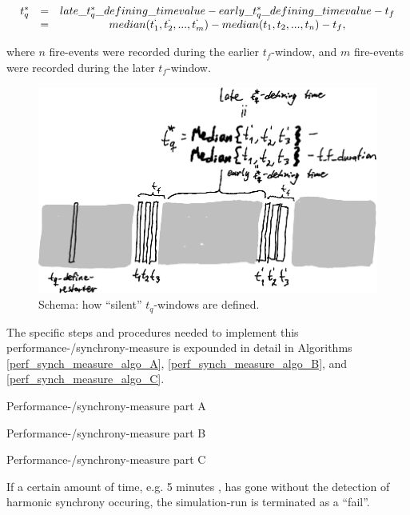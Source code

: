 \begin{equation}
\label{t_q_definition}
\begin{array}{rrclcl}
t_q^* & = & late\_t_q^*\_defining\_timevalue - early\_t_q^*\_defining\_timevalue - t_f \\
& = & median(t_1^`, t_2^`, ..., t_m^`) - median(t_1, t_2, ..., t_n) - t_f , \\
\end{array}
\end{equation}

where $n$ fire-events were recorded during the earlier $t_f$-window, and $m$ fire-events were recorded during the later $t_f$-window.


\begin{figure}[ht!]
	\centering
	\includegraphics[width=0.85\linewidth]{Assets/Figures/Illustrations/t_q_schema.pdf}
	\caption{Schema: how ``silent'' $t_q$-windows are defined. }
	\label{fig:t_q_schema}
\end{figure}


The specific steps and procedures needed to implement this performance-/synchrony-measure is expounded in detail in Algorithms \ref{perf_synch_measure_algo_A}, \ref{perf_synch_measure_algo_B}, and \ref{perf_synch_measure_algo_C}.

\begin{algorithm}
\caption{Performance-/synchrony-measure part A }\label{perf_synch_measure_algo_A}
\end{algorithm}

\begin{algorithm}
\caption{Performance-/synchrony-measure part B }\label{perf_synch_measure_algo_B}
\end{algorithm}

\begin{algorithm}
\caption{Performance-/synchrony-measure part C }\label{perf_synch_measure_algo_C}
\end{algorithm}

If a certain amount of time, e.g. 5 minutes \cite{nymoen_synch}, has gone without the detection of harmonic synchrony occuring, the simulation-run is terminated as a ``fail''.